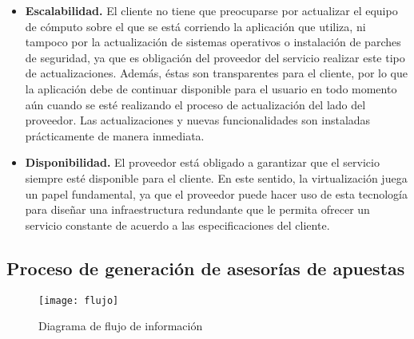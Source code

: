 \begin{itemize}
	\item \textbf{Escalabilidad.} El cliente no tiene que preocuparse por actualizar el equipo de cómputo sobre el que se está corriendo la aplicación que utiliza, ni tampoco por la actualización de sistemas operativos o instalación de parches de seguridad, ya que es obligación del proveedor del servicio realizar este tipo de actualizaciones. Además, éstas son transparentes para el cliente, por lo que la aplicación debe de continuar disponible para el usuario en todo momento aún cuando se esté realizando el proceso de actualización del lado del proveedor. Las actualizaciones y nuevas funcionalidades son instaladas prácticamente de manera inmediata.

	\item \textbf{Disponibilidad.} El proveedor está obligado a garantizar que el servicio siempre esté disponible para el cliente. En este sentido, la virtualización juega un papel fundamental, ya que el proveedor puede hacer uso de esta tecnología para diseñar una infraestructura redundante que le permita ofrecer un servicio constante de acuerdo a las especificaciones del cliente.

\end{itemize}


\subsection{Proceso de generación de asesorías de apuestas}

\begin{figure}[!htb]\centering
   \begin {minipage}{1\textwidth}
     \texttt{[image: flujo]}
     \caption{Diagrama de flujo de información}\label{Fig:flujo}
   \end{minipage}
\end{figure}

